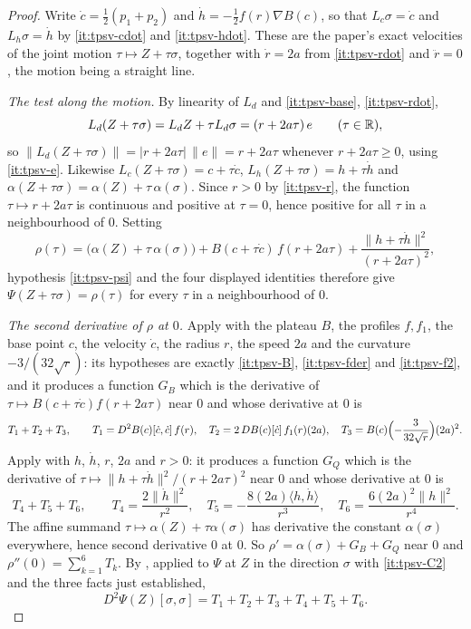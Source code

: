 \begin{proof}
Write $\dot c=\tfrac12(p_1+p_2)$ and $\dot h=-\tfrac12f(r)\nabla B(c)$, so that
$L_c\sigma=\dot c$ and $L_h\sigma=\dot h$ by \ref{it:tpsv-cdot} and
\ref{it:tpsv-hdot}. These are the paper's exact velocities of the joint motion
$\tau\mapsto Z+\tau\sigma$, together with $\dot r=2a$ from \ref{it:tpsv-rdot}
and $\ddot r=0$, the motion being a straight line.

\emph{The test along the motion.} By linearity of $L_d$ and
\ref{it:tpsv-base}, \ref{it:tpsv-rdot},
\[
  L_d(Z+\tau\sigma)=L_dZ+\tau L_d\sigma=(r+2a\tau)\,e
  \qquad(\tau\in\mathbb{R}),
\]
so $\|L_d(Z+\tau\sigma)\|=|r+2a\tau|\,\|e\|=r+2a\tau$ whenever
$r+2a\tau\ge0$, using \ref{it:tpsv-e}. Likewise
$L_c(Z+\tau\sigma)=c+\tau\dot c$, $L_h(Z+\tau\sigma)=h+\tau\dot h$ and
$\alpha(Z+\tau\sigma)=\alpha(Z)+\tau\,\alpha(\sigma)$. Since $r>0$ by
\ref{it:tpsv-r}, the function $\tau\mapsto r+2a\tau$ is continuous and positive
at $\tau=0$, hence positive for all $\tau$ in a neighbourhood of $0$. Setting
\[
  \rho(\tau)=\bigl(\alpha(Z)+\tau\,\alpha(\sigma)\bigr)
    +B(c+\tau\dot c)\,f(r+2a\tau)
    +\frac{\|h+\tau\dot h\|^2}{(r+2a\tau)^2},
\]
hypothesis \ref{it:tpsv-psi} and the four displayed identities therefore give
$\Psi(Z+\tau\sigma)=\rho(\tau)$ for every $\tau$ in a neighbourhood of $0$.

\emph{The second derivative of $\rho$ at $0$.} Apply
 with the plateau $B$, the profiles
$f,f_1$, the base point $c$, the velocity $\dot c$, the radius $r$, the speed
$2a$ and the curvature $-3/(32\sqrt r)$: its hypotheses are exactly
\ref{it:tpsv-B}, \ref{it:tpsv-fder} and \ref{it:tpsv-f2}, and it produces a
function $G_B$ which is the derivative of
$\tau\mapsto B(c+\tau\dot c)f(r+2a\tau)$ near $0$ and whose derivative at $0$
is
\[
  T_1+T_2+T_3,\qquad
  T_1=D^2B(c)[\dot c,\dot c]\,f(r),\quad
  T_2=2\,DB(c)[\dot c]\,f_1(r)(2a),\quad
  T_3=B(c)\Bigl(-\frac{3}{32\sqrt r}\Bigr)(2a)^2 .
\]
Apply  with $h$, $\dot h$, $r$, $2a$ and
$r>0$: it produces a function $G_Q$ which is the derivative of
$\tau\mapsto\|h+\tau\dot h\|^2/(r+2a\tau)^2$ near $0$ and whose derivative at
$0$ is
\[
  T_4+T_5+T_6,\qquad
  T_4=\frac{2\|\dot h\|^2}{r^2},\quad
  T_5=-\frac{8(2a)\langle h,\dot h\rangle}{r^3},\quad
  T_6=\frac{6(2a)^2\|h\|^2}{r^4}.
\]
The affine summand $\tau\mapsto\alpha(Z)+\tau\alpha(\sigma)$ has derivative the
constant $\alpha(\sigma)$ everywhere, hence second derivative $0$ at $0$. So
$\rho'=\alpha(\sigma)+G_B+G_Q$ near $0$ and
$\rho''(0)=\sum_{k=1}^{6}T_k$. By , applied to
$\Psi$ at $Z$ in the direction $\sigma$ with \ref{it:tpsv-C2} and the three
facts just established,
\begin{equation}\label{eq:tpsv-hess}
  D^2\Psi(Z)[\sigma,\sigma]=T_1+T_2+T_3+T_4+T_5+T_6 .
\end{equation}


\end{proof}
